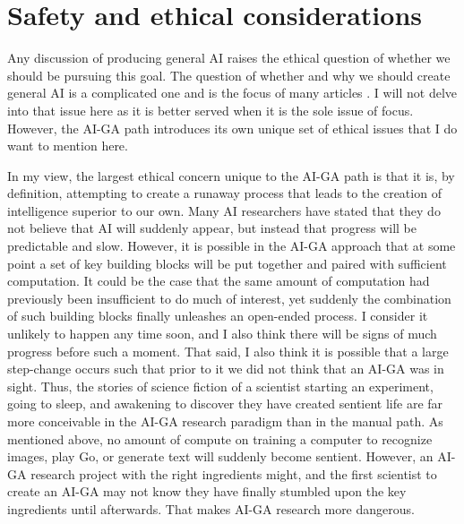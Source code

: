 \documentclass{article}
\begin{document}
\section{Safety and ethical considerations}
\label{ethics}

Any discussion of producing general AI raises the ethical question of whether we should be pursuing this goal. The question of whether and why we should create general AI is a complicated one and is the focus of many articles \cite{russell2015research,everitt2018agi,amodei2016concrete,brundage2016artificial,bostrom2014ethics}. I will not delve into that issue here as it is better served when it is the sole issue of focus. However, the AI-GA path introduces its own unique set of ethical issues that I do want to mention here. 

In my view, the largest ethical concern unique to the AI-GA path is that it is, by definition, attempting to create a runaway process that leads to the creation of intelligence superior to our own. Many AI researchers have stated that they do not believe that AI will suddenly appear, but instead that progress will be predictable and slow. However, it is possible in the AI-GA approach that at some point a set of key building blocks will be put together and paired with sufficient computation. It could be the case that the same amount of computation had previously been insufficient to do much of interest, yet suddenly the combination of such building blocks finally unleashes an open-ended process. I consider it unlikely to happen any time soon, and I also think there will be signs of much progress before such a moment. That said, I also think it is possible that a large step-change occurs such that prior to it we did not think that an AI-GA was in sight. Thus, the stories of science fiction of a scientist starting an experiment, going to sleep, and awakening to discover they have created sentient life are far more conceivable in the AI-GA research paradigm than in the manual path. As mentioned above, no amount of compute on training a computer to recognize images, play Go, or generate text will suddenly become sentient. However, an AI-GA research project with the right ingredients might, and the first scientist to create an AI-GA may not know they have finally stumbled upon the key ingredients until afterwards. That makes AI-GA research more dangerous. 
\end{document}
